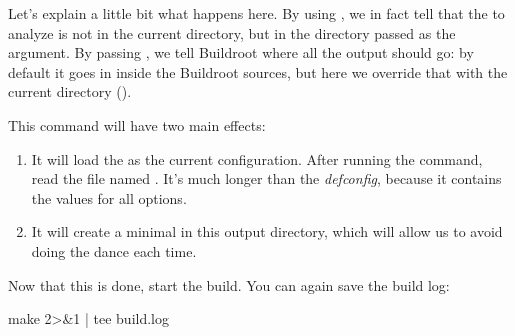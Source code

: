 Let's explain a little bit what happens here. By using
, we in fact tell  that the
 to analyze is not in the current directory, but in the
directory passed as the  argument. By passing , we
tell Buildroot where all the output should go: by default it goes in
 inside the Buildroot sources, but here we override that
with the current directory ().

This command will have two main effects:

\begin{enumerate}

\item It will load the  as the current
  configuration. After running the command, read the file named
  . It's much longer than the {\em defconfig}, because
  it contains the values for all options.

\item It will create a minimal  in this output
  directory, which will allow us to avoid doing the  dance each time.

\end{enumerate}

Now that this is done, start the build. You can again save the build
log:

\begin{bashinput}
make 2>&1 | tee build.log
\end{bashinput}
